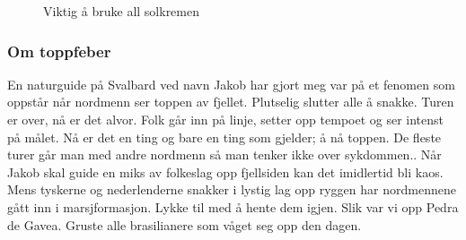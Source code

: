 \begin{figure}[H]
	\centering
	
	\noindent{}
	\caption*{Viktig å bruke all solkremen}
\label{fig:predradegavea}
\end{figure}

\subsubsection{Om toppfeber}
En naturguide på Svalbard ved navn Jakob har gjort meg var på et fenomen
som oppstår når nordmenn ser toppen av fjellet. Plutselig slutter alle
å snakke. Turen er over, nå er det alvor. Folk går inn på linje,
setter opp tempoet og ser intenst på målet. Nå er det en ting og bare en ting som gjelder; å nå toppen.
De fleste turer går man med andre nordmenn så man tenker ikke over
sykdommen.. Når Jakob skal guide en miks av folkeslag opp fjellsiden kan det
imidlertid bli kaos. Mens tyskerne og nederlenderne
snakker i lystig lag opp ryggen har nordmennene gått inn i
marsjformasjon. Lykke til med å hente dem igjen. Slik var vi opp Pedra
de Gavea. Gruste alle
brasilianere som våget seg opp den dagen. \\



